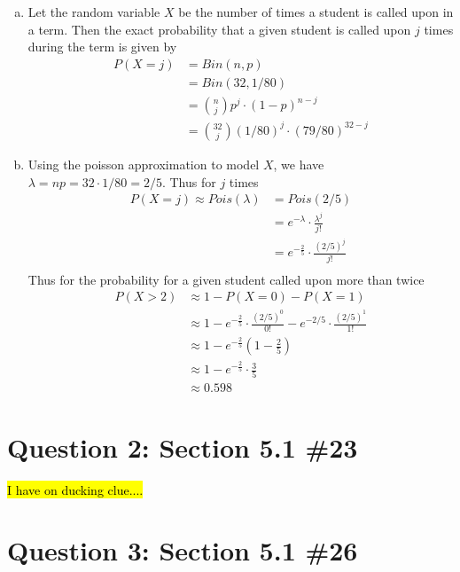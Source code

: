 \documentclass[11pt, oneside]{article}   	%
\begin{document}
\begin{enumerate}[(a)]
	\item Let the random variable $X$ be the number of times a student is called upon in a term. Then the exact probability that a given student is called upon $j$ times during the term is given by
	\begin{align*}
		P(X=j) & = Bin(n,p) \\
		& = Bin(32, 1/80) \\
		& = {n \choose j} p^j \cdot (1-p)^{n-j} \\
		& = {32 \choose j} (1/80)^j \cdot (79/80)^{32-j}
	\end{align*}
	
	\item Using the poisson approximation to model $X$, we have $\lambda = np = 32 \cdot 1/80 = 2/5$. Thus for $j$ times
	\begin{align*}
		P(X=j) \approx Pois(\lambda) & = Pois(2/5) \\
		& = e^{-\lambda} \cdot \frac{\lambda^j}{j!} \\
		& = e^{-\frac{2}{5}} \cdot \frac{(2/5)^j}{j!} \\
	\end{align*}
	Thus for the probability for a given student called upon more than twice
	\begin{align*}
		P(X> 2) & \approx 1 - P(X=0) - P(X=1) \\
		& \approx 1 - e^{-\frac{2}{5}} \cdot \frac{(2/5)^0}{0!} - e^{-2/5} \cdot \frac{(2/5)^1}{1!} \\
		& \approx 1 - e^{-\frac{2}{5}} (1- \frac{2}{5}) \\
		& \approx 1 - e^{-\frac{2}{5}} \cdot \frac{3}{5} \\
		& \approx 0.598
	\end{align*}
	
\end{enumerate}

\section*{Question 2: Section 5.1 \#23}

\hl{I have on ducking clue....}

\section*{Question 3: Section 5.1 \#26}
\end{document}

